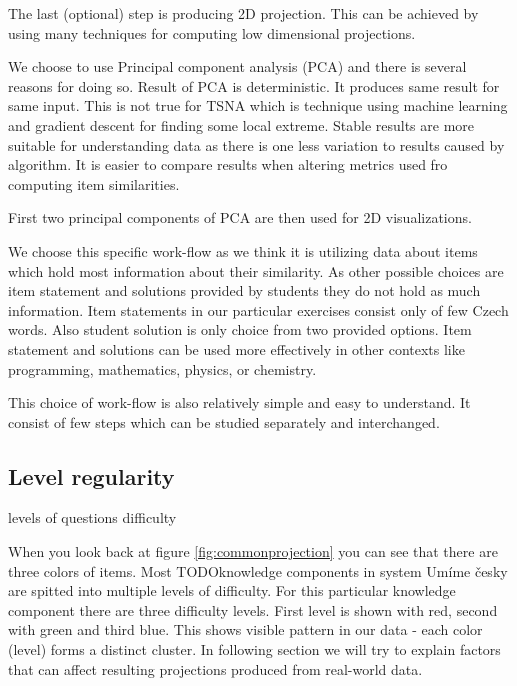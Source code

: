 \documentclass[
  digital, %
  table,   %
  nolof,     %
  nolot,     %
  nocover
]{fithesis3}
\begin{document}

The last (optional) step is producing 2D projection. This can be
achieved by using many techniques for computing low dimensional
projections.


We choose to use Principal component analysis (PCA) and there is several
reasons for doing so. Result of PCA is deterministic. It produces same
result for same input. This is not true for TSNA which is technique
using machine learning and gradient descent for finding some local
extreme. Stable results are more suitable for understanding data as
there is one less variation to results caused by algorithm. It is easier
to compare results when altering metrics used fro computing item
similarities.

First two principal components of PCA are then used for 2D
visualizations.


We choose this specific work-flow as we think it is utilizing data about
items which hold most information about their similarity. As other
possible choices are item statement and solutions provided by students
they do not hold as much information. Item statements in our particular
exercises consist only of few Czech words. Also student solution is only
choice from two provided options. Item statement and solutions can be
used more effectively in other contexts like programming, mathematics,
physics, or chemistry.

This choice of work-flow is also relatively simple and easy to
understand. It consist of few steps which can be studied separately and
interchanged.

\subsection{Level regularity}\label{level-regularity}

levels of questions difficulty

When you look back at figure \ref{fig:commonprojection} you can see that
there are three colors of items. Most TODOknowledge components in system
Umíme česky are spitted into multiple levels of difficulty. For this
particular knowledge component there are three difficulty levels. First
level is shown with red, second with green and third blue. This shows
visible pattern in our data - each color (level) forms a distinct
cluster. In following section we will try to explain factors that can
affect resulting projections produced from real-world data.
\end{document}
